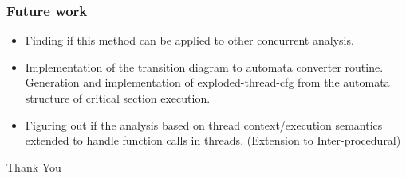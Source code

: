 \documentclass{beamer}
\begin{document}
\begin{frame}
	\frametitle{Future work}
	\begin{itemize}
		\item Finding if this method can be applied to other concurrent analysis.
		\item Implementation of the transition diagram to automata converter routine. Generation and implementation of exploded-thread-cfg from the automata structure of critical section execution.
		\item Figuring out if the analysis based on thread context/execution semantics extended to handle function calls in threads. (Extension to Inter-procedural)
	\end{itemize}
\end{frame}

\begin{frame}

\Huge Thank You

\end{frame}
\end{document}
